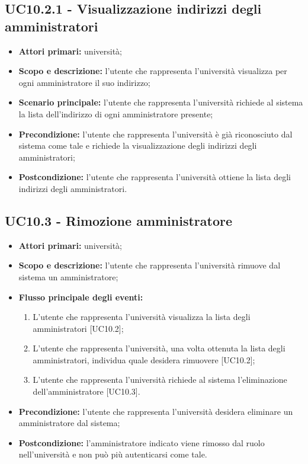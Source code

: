 \documentclass[AnalisiDeiRequisiti.tex]{subfiles}
\begin{document}
\subsection{UC10.2.1 - Visualizzazione indirizzi degli amministratori}
\begin{itemize}
	\item \textbf{Attori primari:} università;
	\item \textbf{Scopo e descrizione:} l'utente che rappresenta l'università visualizza per ogni amministratore il suo indirizzo;
	\item \textbf{Scenario principale:} l'utente che rappresenta l'università richiede al sistema la lista dell'indirizzo di ogni amministratore presente;
	\item \textbf{Precondizione:} l'utente che rappresenta l'università è già riconosciuto dal sistema come tale e richiede la visualizzazione degli indirizzi degli amministratori;
	\item \textbf{Postcondizione:} l'utente che rappresenta l'università ottiene la lista degli indirizzi degli amministratori.
\end{itemize}
\subsection{UC10.3 - Rimozione amministratore}
\begin{itemize}
	\item \textbf{Attori primari:} università;
	\item \textbf{Scopo e descrizione:} l'utente che rappresenta l'università rimuove dal sistema un amministratore;
	\item \textbf{Flusso principale degli eventi:}
	\begin{enumerate}
		\item L'utente che rappresenta l'università  visualizza la lista degli amministratori [UC10.2];
		\item L'utente che rappresenta l'università, una volta ottenuta la lista degli amministratori, individua quale desidera rimuovere [UC10.2];
		\item L'utente che rappresenta l'università richiede al sistema l'eliminazione dell'amministratore [UC10.3].
	\end{enumerate}
	\item \textbf{Precondizione:} l'utente che rappresenta l'università desidera eliminare un amministratore dal sistema;
	\item \textbf{Postcondizione:} l'amministratore indicato viene rimosso dal ruolo nell'università e non può più autenticarsi come tale.
\end{itemize}
\end{document}
